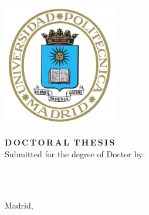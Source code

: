\begin{center}
\begin{spacing}{1.3}
    \textbf{\large {\UNIVERSITY}}\\
    \textbf{\large {\UPMCentre}}\\
    \vspace{5mm}
\end{spacing}
    \includegraphics[width=5cm]{0_frontmatter/figures/EscudoUPM.png}

\begin{spacing}{2.0}
\textbf{\LARGE {\thesisTitle}}
\end{spacing}

\vspace{15 mm}

\begin{spacing}{1.3}
\textbf{\LARGE {D\,O\,C\,T\,O\,R\,A\,L\, T\,H\,E\,S\,I\,S}}\\
\medskip
{\large {Submitted for the degree of Doctor by:}}
\end{spacing}
\end{center}


\begin{center}
\begin{spacing}{1.3}
\textbf{\Large {\thesisAuthor}}\\
{\large {\priorstudies}}\\
\end{spacing}
\end{center}

\vspace{\fill}

\begin{center}
    \Large {Madrid, \thesisDate}
\end{center}